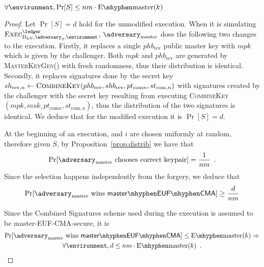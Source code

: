   \begin{proposition}
  \label{prop:forgery:master}
    $\forall \environment, \Pr[S] \leq nm \cdot \mathrm{E \mhyphen master}(k)$
  \end{proposition}

  \begin{proof}
    Let $\Pr[S] = d$ hold for the unmodified execution. When it is simulating
    $\textsc{Exec}^{\ledger}_{\Pi_{\mathrm{LN}}, \adversary_{\mathrm{d}},
    \environment}$, $\adversary_{\mathrm{master}}$ does the following two changes
    to the execution. Firstly, it replaces a single $phb_{\mathrm{rev}}$ public
    master key with $mpk$ which is given by the challenger. Both $mpk$ and
    $phb_{\mathrm{rev}}$ are generated by \textsc{MasterKeyGen}() with fresh
    randomness, thus their distribution is identical. Secondly, it replaces
    signatures done by the secret key $sh_{\mathrm{rev}, n} \gets
    \textsc{CombineKey}(phb_{\mathrm{rev}}, shb_{\mathrm{rev}}, pt_{\mathrm{com}
    n}, st_{\mathrm{com}, n})$ with signatures created by the challenger with
    the secret key resulting from executing \textsc{CombineKey}$(mpk, msk,
    pt_{\mathrm{com} n}, st_{\mathrm{com}, n})$, thus the distribution of the
    two signatures is identical. We deduce that for the modified execution it is
    $\Pr[S] = d$.

    At the beginning of an execution, \alice and $i$ are chosen uniformly
    at random, therefore given $S$, by Proposition~\ref{prop:distrib} we have
    that
    \begin{equation*}
      \Pr[\adversary_{\mathrm{master}} \text{ chooses correct keypair}] =
      \frac{1}{nm} \enspace.
    \end{equation*}
    Since the selection happens independently from the forgery, we deduce that
    \begin{equation*}
      \Pr[\adversary_{\mathrm{master}} \text{ wins } \mathsf{master \mhyphen EUF
      \mhyphen CMA}] \geq \frac{d}{nm}
    \end{equation*}

    Since the Combined Signatures scheme used during the execution is
    assumed to be \textsf{master-EUF-CMA}-secure, it is
    \begin{gather*}
      \Pr[\adversary_{\mathrm{master}} \text{ wins } \mathsf{master \mhyphen EUF
      \mhyphen CMA}] \leq \mathrm{E \mhyphen master}(k) \Rightarrow \\
      \forall \environment, d \leq nm \cdot \mathrm{E \mhyphen master}(k)
      \enspace.
    \end{gather*}
  \end{proof}
